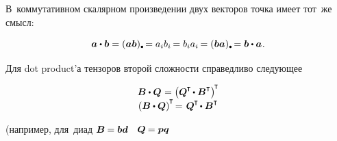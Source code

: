 \begin{otherlanguage}{russian}
В~коммутативном скалярном произведении двух векторов точка имеет тот~же смысл:

\nopagebreak\vspace{-0.2em}\begin{equation}
\bm{a} \dotp \bm{b}
= ( \bm{a} \bm{b} )\hspace{.1ex}\tracedot \hspace{-0.1ex}
= a_i b_i \hspace{-0.2ex}
= b_i a_i \hspace{-0.2ex}
= ( \bm{b} \bm{a} )\hspace{.1ex}\tracedot \hspace{-0.1ex}
= \bm{b} \dotp \bm{a}
\hspace{.1ex} .
\end{equation}

Для dot product’а тензоров второй сложности справедливо следующее

\nopagebreak\vspace{-0.8em}\begin{equation}\label{transposeofdotproduct}
\begin{array}{c}
\bm{B} \dotp \bm{Q} \hspace{.1ex} = \left({ \bm{Q}^{\hspace{-0.1ex}\T} \hspace{-0.2ex}\dotp \bm{B}^{\T} }\right)^{\hspace{-0.25ex}\T}
\\[.1em]
\left({ \bm{B} \dotp \bm{Q}}\right)^{\hspace{-0.1ex}\T} \hspace{-0.3ex} = \hspace{.2ex} \bm{Q}^{\hspace{-0.1ex}\T} \hspace{-0.2ex}\dotp \bm{B}^{\T}
\end{array}
\end{equation}

\vspace{-0.1em}\noindent
(\hspace{.25ex}например, для~диад ${\bm{B} \hspace{-0.1ex} = \bm{b}\bm{d}}$ ~${\bm{Q} \hspace{-0.1ex} = \bm{p}\bm{q}}$


\end{otherlanguage}
